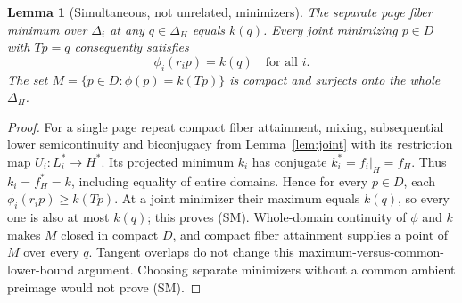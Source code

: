\documentclass[11pt]{article}
\newtheorem{lemma}[theorem]{Lemma}
\begin{document}
\begin{lemma}[Simultaneous, not unrelated, minimizers]\label{lem:simultaneous}
The separate page fiber minimum over $\Delta_i$ at any $q\in\Delta_H$ equals $k(q)$. Every joint minimizing $p\in D$ with $Tp=q$ consequently satisfies
\[
 \phi_i(r_ip)=k(q)\quad\text{for all }i.                               \tag{SM}
\]
The set $M=\{p\in D:\phi(p)=k(Tp)\}$ is compact and surjects onto the whole $\Delta_H$.
\end{lemma}
\begin{proof}
For a single page repeat compact fiber attainment, mixing, subsequential lower semicontinuity and biconjugacy from Lemma~\ref{lem:joint} with its restriction map $U_i:L_i^*\to H^*$. Its projected minimum $k_i$ has conjugate $k_i^*=f_i|_H=f_H$. Thus $k_i=f_H^*=k$, including equality of entire domains. Hence for every $p\in D$, each $\phi_i(r_ip)\geq k(Tp)$. At a joint minimizer their maximum equals $k(q)$, so every one is also at most $k(q)$; this proves (SM). Whole-domain continuity of $\phi$ and $k$ makes $M$ closed in compact $D$, and compact fiber attainment supplies a point of $M$ over every $q$. Tangent overlaps do not change this maximum-versus-common-lower-bound argument. Choosing separate minimizers without a common ambient preimage would not prove (SM).
\end{proof}
\end{document}
